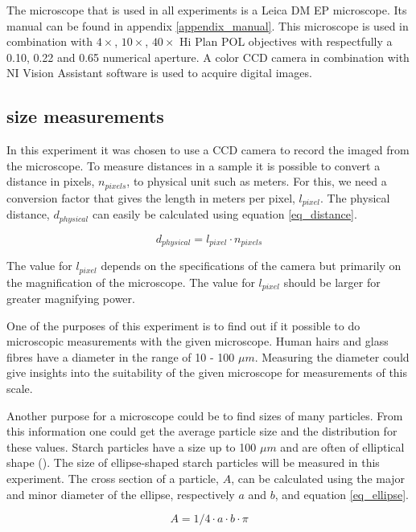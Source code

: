 The microscope that is used in all experiments is a Leica DM EP microscope. Its manual can be found in appendix \ref{appendix_manual}. This microscope is used in combination with $4\times$, $10\times$, $40\times$ Hi Plan POL objectives with respectfully a 0.10, 0.22 and 0.65 numerical aperture. A color CCD camera in combination with NI Vision Assistant software is used to acquire digital images.

\subsection{size measurements}
In this experiment it was chosen to use a CCD camera to record the imaged from the microscope. To measure distances in a sample it is possible to convert a distance in pixels, $n_{pixels}$, to physical unit such as meters. For this, we need a conversion factor that gives the length in meters per pixel, $l_{pixel}$. The physical distance, $d_{physical}$ can easily be calculated using equation \ref{eq_distance}.

\begin{equation}
	\label{eq_distance}
	d_{physical} = l_{pixel} \cdot n_{pixels}
\end{equation}

The value for $l_{pixel}$ depends on the specifications of the camera but primarily on the magnification of the microscope. The value for $l_{pixel}$ should be larger for greater magnifying power.
\bigskip

One of the purposes of this experiment is to find out if it possible to do microscopic measurements with the given microscope. Human hairs and glass fibres have a diameter in the range of 10 - 100 $\mu m$. Measuring the diameter could give insights into the suitability of the given microscope for measurements of this scale.

Another purpose for a microscope could be to find sizes of many particles. From this information one could get the average particle size and the distribution for these values. Starch particles have a size up to 100 $\mu m$ and are often of elliptical shape (\cite{starch}). The size of ellipse-shaped starch particles will be measured in this experiment. The cross section of a particle, $A$, can be calculated using the major and minor diameter of the ellipse, respectively $a$ and $b$, and equation \ref{eq_ellipse}.

\begin{equation}
	\label{eq_ellipse}
	A = 1/4 \cdot a \cdot b \cdot \pi
\end{equation}
	
